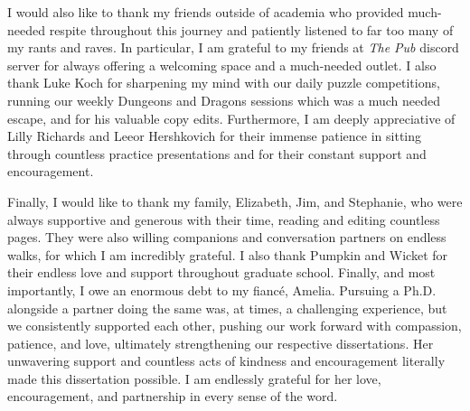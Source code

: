 I would also like to thank my friends outside of academia who provided much-needed respite throughout this journey and patiently listened to far too many of my rants and raves. In particular, I am grateful to my friends at \textit{The Pub} discord server for always offering a welcoming space and a much-needed outlet. I also thank Luke Koch for sharpening my mind with our daily puzzle competitions, running our weekly Dungeons and Dragons sessions which was a much needed escape, and for his valuable copy edits. Furthermore, I am deeply appreciative of Lilly Richards and Leeor Hershkovich for their immense patience in sitting through countless practice presentations and for their constant support and encouragement.

Finally, I would like to thank my family, Elizabeth, Jim, and Stephanie, who were always supportive and generous with their time, reading and editing countless pages. They were also willing companions and conversation partners on endless walks, for which I am incredibly grateful. I also thank Pumpkin and Wicket for their endless love and support throughout graduate school. Finally, and most importantly, I owe an enormous debt to my fiancé, Amelia. Pursuing a Ph.D. alongside a partner doing the same was, at times, a challenging experience, but we consistently supported each other, pushing our work forward with compassion, patience, and love, ultimately strengthening our respective dissertations. Her unwavering support and countless acts of kindness and encouragement literally made this dissertation possible. I am endlessly grateful for her love, encouragement, and partnership in every sense of the word.



\clearpage
